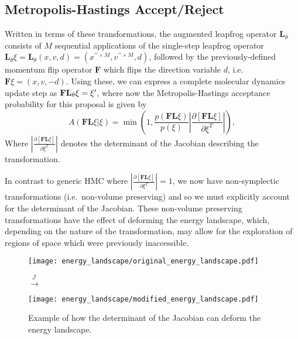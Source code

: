 \documentclass[main.tex]{subfiles}
\begin{document}
\subsection{Metropolis-Hastings Accept/Reject}
%
Written in terms of these transformations, the augmented leapfrog operator $\mathbf{L}_{\theta}$ consists of $M$
sequential applications of the single-step leapfrog operator $\mathbf{L}_{\theta} \xi = \mathbf{L}_{\theta}(x, v, d) =
(x^{\prime\prime\times M}, v^{\prime\prime\times M}, d)$, followed by the previously-defined momentum flip operator
$\mathbf{F}$ which flips the direction variable $d$, i.e.\ $\mathbf{F}\xi = (x, v, -d)$.
%
Using these, we can express a complete molecular dynamics update step as $\mathbf{FL}_{\theta}\xi = {\xi^{\prime}}$, where now
the Metropolis-Hastings acceptance probability for this proposal is given by
%
\begin{equation}
    A(\mathbf{F}\mathbf{L} \xi | \xi) = \min\left(1,
        \frac{p(\mathbf{F}\mathbf{L}\xi)}{p(\xi)}\left|
        \frac{\partial\left[\mathbf{F}\mathbf{L}\xi\right]}
            {\partial\xi^{T}}\right|\right),
\end{equation}
%
Where $\left|\frac{\partial\left[\mathbf{F}\mathbf{L}\xi\right]} {\partial\xi^{T}}\right|$ denotes the determinant of
the Jacobian describing the transformation.

In contrast to generic HMC where $\left|\frac{\partial\left[\mathbf{F}\mathbf{L}\xi\right]} {\partial\xi^{T}}\right| =
1$, we now have non-symplectic transformations (i.e.\ non-volume preserving) and so we must explicitly account for the
determinant of the Jacobian.
%
These non-volume preserving transformations have the effect of deforming the energy landscape, which, depending on the
nature of the transformation, may allow for the exploration of regions of space which were previously inaccessible.
%
\newcommand{\energyA}{\texttt{[image: energy\_landscape/original\_energy\_landscape.pdf]}}
\newcommand{\energyB}{\texttt{[image: energy\_landscape/modified\_energy\_landscape.pdf]}}
%
\begin{figure}
  \centering 
  \Huge
  \parbox{\widthof{\energyA}}{\energyA} $\overset{\mathcal{J}}{\longrightarrow}$
  \parbox{\widthof{\energyB}}{\energyB} 
  \normalsize
  \caption{Example of how the determinant of the Jacobian can deform the energy landscape.}
\end{figure}
\end{document}
